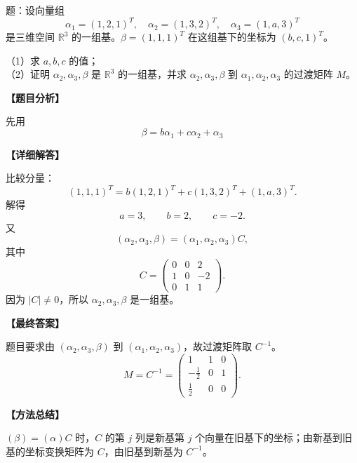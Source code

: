 ﻿\documentclass[11pt,a4paper,UTF8]{ctexart}
\begin{document}
\begin{answerbox}
题：设向量组
\[
\alpha_1=(1,2,1)^T,\quad \alpha_2=(1,3,2)^T,\quad \alpha_3=(1,a,3)^T
\]
是三维空间 $\mathbb R^3$ 的一组基。$\beta=(1,1,1)^T$ 在这组基下的坐标为 $(b,c,1)^T$。

（1）求 $a,b,c$ 的值；\\
（2）证明 $\alpha_2,\alpha_3,\beta$ 是 $\mathbb R^3$ 的一组基，并求 $\alpha_2,\alpha_3,\beta$ 到 $\alpha_1,\alpha_2,\alpha_3$ 的过渡矩阵 $M$。

\textbf{【题目分析】}

先用
\[\beta=b\alpha_1+c\alpha_2+\alpha_3\]

\textbf{【详细解答】}

比较分量：
\[
(1,1,1)^T=b(1,2,1)^T+c(1,3,2)^T+(1,a,3)^T.
\]
解得
\[
a=3,\qquad b=2,\qquad c=-2.
\]
又
\[
(\alpha_2,\alpha_3,\beta)=(\alpha_1,\alpha_2,\alpha_3)
C,
\]
其中
\[
C=
\begin{pmatrix}
0&0&2\\
1&0&-2\\
0&1&1
\end{pmatrix}.
\]
因为 \(|C|\ne0\)，所以 \(\alpha_2,\alpha_3,\beta\) 是一组基。

\textbf{【最终答案】}

题目要求由 $(\alpha_2,\alpha_3,\beta)$ 到 $(\alpha_1,\alpha_2,\alpha_3)$，故过渡矩阵取 $C^{-1}$。
\[
M=C^{-1}=
\begin{pmatrix}
1&1&0\\
-\frac12&0&1\\
\frac12&0&0
\end{pmatrix}.
\]

\textbf{【方法总结】}

\((\beta)=(\alpha)C\) 时，\(C\) 的第 \(j\) 列是新基第 \(j\) 个向量在旧基下的坐标；由新基到旧基的坐标变换矩阵为 \(C\)，由旧基到新基为 \(C^{-1}\)。
\end{answerbox}
\end{document}
